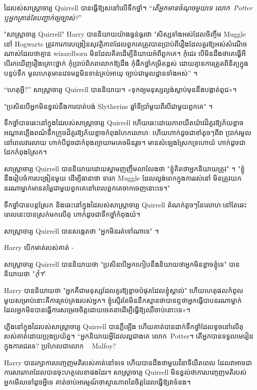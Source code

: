 ដៃរបស់សាស្រ្តាចារ្យ Quirrell បានធ្វើឱ្យសនៅលើទឹកថ្នាំ។ “\emph{តើ​អ្នក​មាន​ចំណុច​មួយ​ទេ លោក~Potter ឬ​អ្នក​គ្រាន់​តែ​បញ្ជាក់​ឲ្យ​ច្បាស់?}”

"សាស្រ្តាចារ្យ Quirrell" Harry បាននិយាយយ៉ាងធ្ងន់ធ្ងរថា "សិស្សទាំងអស់ដែលចិញ្ចឹម Muggle នៅ Hogwarts ត្រូវការការបង្រៀនសុវត្ថិភាពដែលពួកគេត្រូវបានប្រាប់ពីរឿងដែលគួរឱ្យអស់សំណើចណាស់ដែលថាគ្មាន wizardborn មិនដែលគិតដើម្បីនិយាយអំពីពួកគេ។ កុំជេរ បើមិនដឹងថាគេធ្វើអី បើរកឃើញរឿងគ្រោះថ្នាក់ កុំប្រាប់ពិភពលោកឱ្យដឹង កុំផឹកថ្នាំកម្រិតខ្ពស់ ដោយគ្មានការត្រួតពិនិត្យក្នុងបន្ទប់ទឹក មូលហេតុមានវេទមន្តមិនទាន់គ្រប់អាយុ ច្បាប់ជាមូលដ្ឋានទាំងអស់” ។

“ហេតុអ្វី?” សាស្ត្រាចារ្យ Quirrell បាននិយាយ។ «ទុក​ឲ្យ​មនុស្ស​ល្ងង់​ស្លាប់​មុន​នឹង​បង្កាត់​ពូជ»។

"ប្រសិនបើអ្នកមិនខ្វល់នឹងការបាត់បង់ Slytherins ឆ្នាំទីប្រាំមួយពីរបីជាមួយពួកគេ" ។

ទឹកថ្នាំបានឆេះនៅក្នុងដៃរបស់សាស្រ្តាចារ្យ Quirrell ហើយឆេះដោយភាពយឺតយ៉ាវដ៏គួរឱ្យភ័យខ្លាច អណ្តាតភ្លើងពណ៌ទឹកក្រូចដ៏គួរឱ្យភ័យខ្លាចកំពុងហែកលោហៈ ហើយហាក់ដូចជាខាំតូចៗពីវា ប្រាក់រមួលនៅពេលវារលាយ ហាក់បីដូចជាកំពុងព្យាយាមគេចមិនរួច។ មាន​សំឡេង​ស្រែក​ទ្រហោយំ ហាក់​ដូច​ជា​ដែក​កំពុង​ស្រែក។

សាស្ត្រាចារ្យ Quirrell បាននិយាយដោយស្នាមញញឹមលាលែងថា "ខ្ញុំគិតថាអ្នកនិយាយត្រូវ" ។ "ខ្ញុំនឹងរៀបចំការបង្រៀនមួយ ដើម្បីធានាថា ទារក Muggle ដែលល្ងង់ពេកក្នុងការរស់នៅ មិនត្រូវយកនរណាម្នាក់មានតម្លៃជាមួយពួកគេនៅពេលពួកគេចាកចេញនោះទេ។"

ទឹកថ្នាំបានបន្តស្រែក និងឆេះនៅក្នុងដៃរបស់សាស្ត្រាចារ្យ Quirrell តំណក់តូចៗនៃលោហៈនៅតែឆេះ ពេលនេះបានស្រក់មកលើតុ ហាក់ដូចជាទឹកថ្នាំកំពុងយំ។

សាស្រ្តាចារ្យ Quirrell បានសង្កេតថា "អ្នកមិនរត់ទៅណាទេ" ។

Harry បើកមាត់របស់គាត់ -

សាស្ត្រាចារ្យ Quirrell បាននិយាយថា "ប្រសិនបើអ្នកហៀបនឹងនិយាយថាអ្នកមិនខ្លាចខ្ញុំទេ" បាននិយាយថា "\emph{កុំ។}"

Harry បាននិយាយថា "អ្នកគឺជាមនុស្សដែលគួរឱ្យខ្លាចបំផុតដែលខ្ញុំស្គាល់" ហើយហេតុផលកំពូលមួយសម្រាប់នោះគឺការគ្រប់គ្រងរបស់អ្នក។ ខ្ញុំស្ទើរតែមិននឹកស្មានថាបានឮថាអ្នកធ្វើបាបនរណាម្នាក់ដែលអ្នកមិនបានធ្វើការសម្រេចចិត្តដោយចេតនាដើម្បីធ្វើឱ្យឈឺចាប់នោះទេ»។

ភ្លើងនៅក្នុងដៃរបស់សាស្រ្តាចារ្យ Quirrell បានភ្លឺឡើង ហើយគាត់បានដាក់ទឹកថ្នាំដែលខូចនៅលើតុរបស់គាត់ដោយប្រុងប្រយ័ត្ន។ “អ្នកនិយាយអ្វីដែលល្អជាងគេ លោក~Potter។ តើ​អ្នក​បាន​ទទួល​មេរៀន​ក្នុង​ការ​ជេរ​ទេ? ប្រហែលជាលោក ~ Malfoy?

Harry បានរក្សាការបញ្ចេញមតិរបស់គាត់នៅទទេ ហើយបានដឹងថាមួយវិនាទីយឺតពេល ដែលវាអាចជាការសារភាពដែលបានចុះហត្ថលេខាផងដែរ។ សាស្រ្តាចារ្យ Quirrell មិនខ្វល់ថាការបញ្ចេញមតិរបស់អ្នកមើលទៅដូចអ្វីទេ គាត់ចាប់អារម្មណ៍ថាស្ថានភាពនៃចិត្តដែលធ្វើឱ្យវាទំនង។


